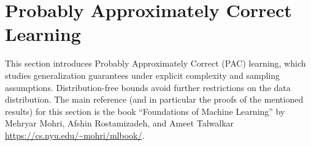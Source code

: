 \section{Probably Approximately Correct Learning}

This section introduces Probably Approximately Correct (PAC) learning, which studies generalization guarantees under explicit complexity and sampling assumptions. Distribution-free bounds avoid further restrictions on the data distribution.
The main reference (and in particular the proofs of the mentioned results) for this section is the book ``Foundations of Machine Learning'' by Mehryar Mohri, Afshin Rostamizadeh, and Ameet Talwalkar \url{https://cs.nyu.edu/~mohri/mlbook/}.




